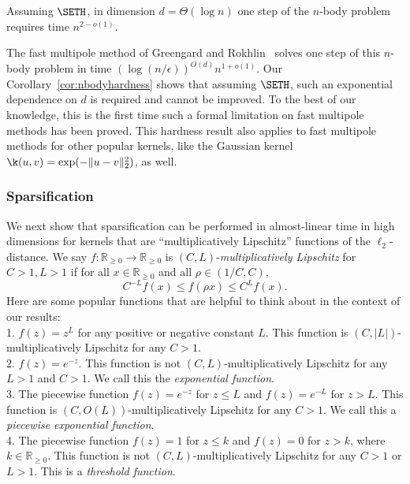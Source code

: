 \begin{corollary} \label{cor:nbodyhardness} Assuming $\SETH$, in
dimension $d = \Theta(\log n)$ one step of the $n$-body problem requires
time $n^{2 - o(1)}$.  \end{corollary}

The fast multipole method of Greengard and Rokhlin~\cite{gr87, gr89}
solves one step of this $n$-body problem in time
$(\log(n/\epsilon))^{O(d)} n^{1+o(1)}$. Our
Corollary~\ref{cor:nbodyhardness} shows that assuming $\SETH$, such an
exponential dependence on $d$ is required and cannot be improved. To the
best of our knowledge, this is the first time such a formal limitation
on fast multipole methods has been proved. This hardness result also
applies to fast multipole methods for other popular kernels, like the
Gaussian kernel $\k(u,v) = \exp(-\|u - v\|_2^2)$, as well.





\subsubsection{Sparsification}

We next show that sparsification can be performed in almost-linear time
in high dimensions for kernels that are ``multiplicatively Lipschitz''
functions of the $\ell_2$-distance. We say $f:\mathbb{R}_{\ge
  0}\rightarrow \mathbb{R}_{\ge 0}$ is $(C,L)$-\emph{multiplicatively
    Lipschitz} for $C > 1, L > 1$ if for all $x\in \mathbb{R}_{\ge 0}$
    and all $\rho\in (1/C,C)$, $$C^{-L} f(x)\le f(\rho x)\le C^L f(x).$$
    Here are some popular functions that are helpful to think about in
    the context of our results:\\ ${}$\hspace{4mm}1. $f(z) = z^L$ for
    any positive or negative constant $L$. This function is
    $(C,|L|)$-multiplicatively Lipschitz for any $C > 1$. \\
      ${}$\hspace{4mm}2. $f(z) = e^{-z}$. This function is not
      $(C,L)$-multiplicatively Lipschitz for any $L > 1$ and $C > 1$. We
      call this the \emph{exponential function}.\\ ${}$\hspace{4mm}3.
      The piecewise function $f(z) = e^{-z}$ for $z\le L$ and $f(z) =
      e^{-L}$ for $z > L$. This function is $(C,O(L))$-multiplicatively
      Lipschitz for any $C > 1$. We call this a \emph{piecewise
        exponential function}. \\ ${}$\hspace{4mm}4. The piecewise
        function $f(z) = 1$ for $z\le k$ and $f(z) = 0$ for $z > k$,
        where $k\in \mathbb{R}_{\ge 0}$. This function is not
        $(C,L)$-multiplicatively Lipschitz for any $C > 1$ or $L > 1$.
        This is a \emph{threshold function}.


